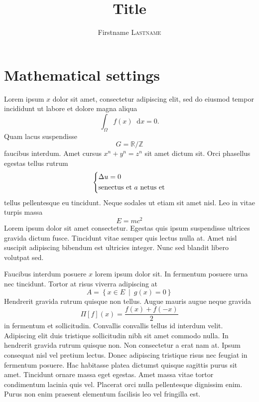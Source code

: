 \documentclass[12pt,a4paper]{article}
\title{Title}
\author{Firstname \textsc{Lastname}}
\date{}
\newcommand{\bbR}{\mathbb{R}}
\newcommand{\bbZ}{\mathbb{Z}}
\newcommand{\di}[1]{\mathop{}\!\mathrm{d}#1}
\newcommand{\setst}[2]{\left\lbrace#1\ \middle\vert\ #2\right\rbrace}
\theoremstyle{definition}
\theoremstyle{plain}
\theoremstyle{remark}
\begin{document}
\maketitle

\tableofcontents


\section{Mathematical settings}

Lorem ipsum \( x \) dolor sit amet, consectetur adipiscing elit, sed do eiusmod tempor incididunt ut labore et dolore magna aliqua
\[
    \int_\Omega f(x) \di{x} = 0.
\]
Quam lacus suspendisse \[
    G = \bbR / \bbZ
\] faucibus interdum.
Amet cursus
\( x^n + y^n = z^n \)
sit amet dictum sit.
Orci phasellus egestas tellus rutrum
\[
    \begin{dcases}
        \Delta u = 0 \\
        \text{senectus et \( a \) netus et}
    \end{dcases}
\]
tellus pellentesque eu tincidunt. Neque sodales ut etiam sit amet nisl.
Leo in vitae turpis massa
\[
    E = m c^2 %
\]
Lorem ipsum dolor sit amet consectetur.
Egestas quis ipsum suspendisse ultrices gravida dictum fusce.
Tincidunt vitae semper quis lectus nulla at.
Amet nisl suscipit adipiscing bibendum est ultricies integer.
Nunc sed blandit libero volutpat sed.

Faucibus interdum posuere \( x \) lorem ipsum dolor sit.
In fermentum posuere urna nec tincidunt.
Tortor at risus viverra adipiscing at
\[
    A = \setst{x \in E}{g(x) = 0} %
\]
Hendrerit gravida rutrum quisque non tellus.
Augue mauris augue neque gravida \[
    \Pi[f](x) = \frac{f(x) + f(-x)}{2}
\] in fermentum et sollicitudin.
Convallis convallis tellus id interdum velit.
Adipiscing elit duis tristique sollicitudin nibh sit amet commodo nulla.
In hendrerit gravida rutrum quisque non.
Non consectetur a erat nam at.
Ipsum consequat nisl vel pretium lectus.
Donec adipiscing tristique risus nec feugiat in fermentum posuere.
Hac habitasse platea dictumst quisque sagittis purus sit amet.
Tincidunt ornare massa eget egestas.
Amet massa vitae tortor condimentum lacinia quis vel.
Placerat orci nulla pellentesque dignissim enim.
Purus non enim praesent elementum facilisis leo vel fringilla est.
\end{document}
